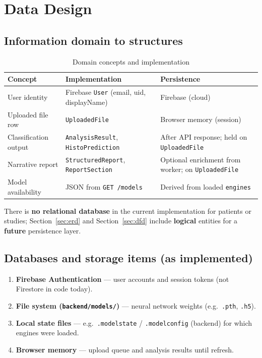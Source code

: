 \section{Data Design}
\label{sec:data}

\subsection{Information domain to structures}

\begin{table}[htbp]
  \centering
  \caption{Domain concepts and implementation}
  \begin{tabular}{@{}p{}p{}p{}@{}}
    \toprule
    \textbf{Concept} & \textbf{Implementation} & \textbf{Persistence} \\
    \midrule
    User identity & Firebase \texttt{User} (email, uid, displayName) & Firebase (cloud) \\
    Uploaded file row & \texttt{UploadedFile} & Browser memory (session) \\
    Classification output & \texttt{AnalysisResult}, \texttt{HistoPrediction} & After API response; held on \texttt{UploadedFile} \\
    Narrative report & \texttt{StructuredReport}, \texttt{ReportSection} & Optional enrichment from worker; on \texttt{UploadedFile} \\
    Model availability & JSON from \texttt{GET /models} & Derived from loaded \texttt{engines} \\
    \bottomrule
  \end{tabular}
\end{table}

There is \textbf{no relational database} in the current implementation for patients or studies; Section~\ref{sec:erd} and Section~\ref{sec:dfd} include \textbf{logical} entities for a \textbf{future} persistence layer.

\subsection{Databases and storage items (as implemented)}

\begin{enumerate}
  \item \textbf{Firebase Authentication} --- user accounts and session tokens (not Firestore in code today).
  \item \textbf{File system (\texttt{backend/models/})} --- neural network weights (e.g.\ \texttt{.pth}, \texttt{.h5}).
  \item \textbf{Local state files} --- e.g.\ \texttt{.modelstate} / \texttt{.modelconfig} (backend) for which engines were loaded.
  \item \textbf{Browser memory} --- upload queue and analysis results until refresh.
\end{enumerate}

